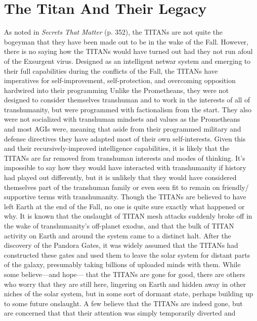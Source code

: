 \section{The Titan And Their Legacy}

As noted in \textit{Secrets That Matter} (p. 352), the TITANs 
are not quite the bogeyman that they have been made 
out to be in the wake of the Fall. However, there is no 
saying how the TITANs would have turned out had 
they not run afoul of the Exsurgent virus. Designed as 
an intelligent netwar system and emerging to their full 
capabilities during the conflicts of the Fall, the TITANs 
have imperatives for self-improvement, self-protection, 
and overcoming opposition hardwired into their programming
Unlike the Prometheans, they were not
designed to consider themselves transhuman and to 
work in the interests of all of transhumanity, but were 
programmed with factionalism from the start. They 
also were not socialized with transhuman mindsets 
and values as the Prometheans and most AGIs were, 
meaning that aside from their programmed military 
and defense directives they have adapted most of their 
own self-interests. Given this and their recursively-improved
intelligence capabilities, it is likely that the
TITANs are far removed from transhuman interests 
and modes of thinking. It's impossible to say how they 
would have interacted with transhumanity if history 
had played out differently, but it is unlikely that they 
would have considered themselves part of the transhuman
family or even seen fit to remain on friendly/
supportive terms with transhumanity.
Though the TITANs are believed to have left Earth 
at the end of the Fall, no one is quite sure exactly 
what happened or why. It is known that the onslaught 
of TITAN mesh attacks suddenly broke off in the 
wake of transhumanity's off-planet exodus, and that 
the bulk of TITAN activity on Earth and around the 
system came to a distinct halt. After the discovery 
of the Pandora Gates, it was widely assumed that 
the TITANs had constructed these gates and used 
them to leave the solar system for distant parts of 
the galaxy, presumably taking billions of uploaded 
minds with them. While some believe—and hope—
that the TITANs are gone for good, there are others 
who worry that they are still here, lingering on Earth 
and hidden away in other niches of the solar system, 
but in some sort of dormant state, perhaps building 
up to some future onslaught. A few believe that the 
TITANs are indeed gone, but are concerned that that 
their attention was simply temporarily diverted and 
